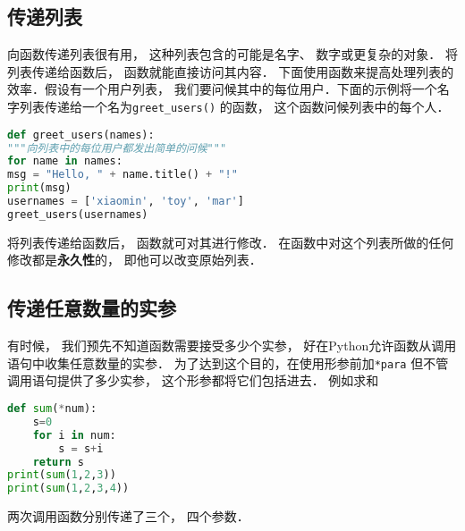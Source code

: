 \subsection{传递列表}
向函数传递列表很有用， 这种列表包含的可能是名字、 数字或更复杂的对象． 将列表传递给函数后， 函数就能直接访问其内容． 下面使用函数来提高处理列表的效率．假设有一个用户列表， 我们要问候其中的每位用户．下面的示例将一个名字列表传递给一个名为\verb|greet_users()| 的函数， 这个函数问候列表中的每个人．
\begin{lstlisting}[language=python]
def greet_users(names):
"""向列表中的每位用户都发出简单的问候"""
for name in names:
msg = "Hello, " + name.title() + "!"
print(msg)
usernames = ['xiaomin', 'toy', 'mar']
greet_users(usernames)
\end{lstlisting}
将列表传递给函数后， 函数就可对其进行修改． 在函数中对这个列表所做的任何修改都是\textbf{永久性}的， 即他可以改变原始列表．

\subsection{传递任意数量的实参}
有时候， 我们预先不知道函数需要接受多少个实参， 好在Python允许函数从调用语句中收集任意数量的实参． 为了达到这个目的，在使用形参前加\verb|*para| 但不管调用语句提供了多少实参， 这个形参都将它们包括进去． 例如求和
\begin{lstlisting}[language=python]
def sum(*num):
    s=0
    for i in num:
        s = s+i
    return s
print(sum(1,2,3))
print(sum(1,2,3,4))
\end{lstlisting}
两次调用函数分别传递了三个， 四个参数．